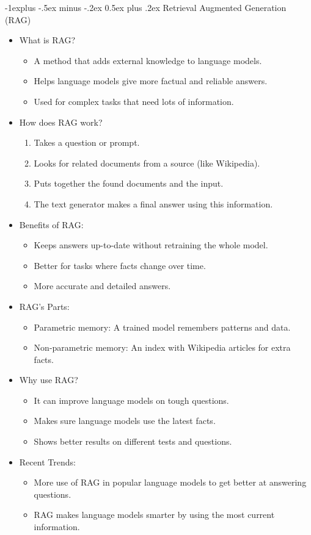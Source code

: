 \documentclass[10pt,landscape]{article}
\makeatletter
\renewcommand{\subsection}{\@startsection{subsection}{2}{0mm}%
                                {-1explus -.5ex minus -.2ex}%
                                {0.5ex plus .2ex}%
                                {\normalfont\normalsize\bfseries}}
\makeatother
\begin{document}
\begin{multicols}{3}
\subsection{Retrieval Augmented Generation (RAG)}
\begin{itemize}
    \item What is RAG?
    \begin{itemize}
        \item A method that adds external knowledge to language models.
        \item Helps language models give more factual and reliable answers.
        \item Used for complex tasks that need lots of information.
    \end{itemize}
    \item How does RAG work?
    \begin{enumerate}
        \item Takes a question or prompt.
        \item Looks for related documents from a source (like Wikipedia).
        \item Puts together the found documents and the input.
        \item The text generator makes a final answer using this information.
    \end{enumerate}
    \item Benefits of RAG:
    \begin{itemize}
        \item Keeps answers up-to-date without retraining the whole model.
        \item Better for tasks where facts change over time.
        \item More accurate and detailed answers.
    \end{itemize}
    \item RAG's Parts:
    \begin{itemize}
        \item Parametric memory: A trained model remembers patterns and data.
        \item Non-parametric memory: An index with Wikipedia articles for extra facts.
    \end{itemize}
    \item Why use RAG?
    \begin{itemize}
        \item It can improve language models on tough questions.
        \item Makes sure language models use the latest facts.
        \item Shows better results on different tests and questions.
    \end{itemize}
    \item Recent Trends:
    \begin{itemize}
        \item More use of RAG in popular language models to get better at answering questions.
        \item RAG makes language models smarter by using the most current information.
    \end{itemize}
\end{itemize}


\end{multicols}
\end{document}
